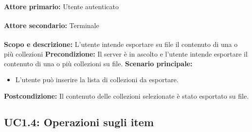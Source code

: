 \documentclass{scalatekids-article}
\begin{document}
\textbf{Attore primario:} Utente autenticato\\ \\
\textbf{Attore secondario:} Terminale\\ \\
\textbf{Scopo e descrizione:} L'utente intende esportare su file il contenuto di una o più collezioni
\textbf{Precondizione:} Il server è in ascolto e l'utente intende esportare il contenuto di una o più collezioni su file.
\textbf{Scenario principale:}
\begin{itemize}
\item L'utente può inserire la lista di collezioni da esportare.
\end{itemize}
\textbf{Postcondizione:} Il contenuto delle collezioni selezionate è stato esportato su file.

\subsection{UC1.4: Operazioni sugli item}
\end{document}
